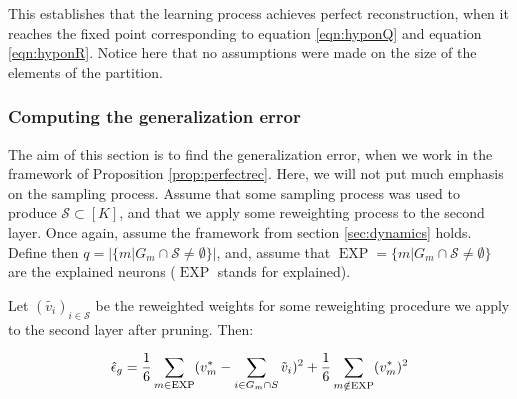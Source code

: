 This establishes that the learning process achieves perfect reconstruction, when it reaches the fixed point corresponding to equation \ref{eqn:hyponQ} and equation \ref{eqn:hyponR}. Notice here that no assumptions were made on the size of the elements of the partition.


\subsubsection{Computing the generalization error}

The aim of this section is to find the generalization error, when we work in the framework of Proposition \ref{prop:perfectrec}. Here, we will not put much emphasis on the sampling process. Assume that some sampling process was used to produce $\mathcal{S} \subset [K]$, and that we apply some reweighting process to the second layer. Once again, assume the framework from section \ref{sec:dynamics} holds. Define then $q = \lvert \{ m | G_m \cap \mathcal{S} \neq \emptyset \} \rvert$, and, assume that $ \operatorname{EXP} = \{ m | G_m \cap \mathcal{S} \neq \emptyset \}$  are the explained neurons ($\operatorname{EXP}$ stands for explained).

\begin{theorem}\label{thm:geneerrorreweight}
    Let $(\tilde{v_i})_{i\in \mathcal{S}}$ be the reweighted weights for some reweighting procedure we apply to the second layer after pruning. Then:

    $$\hat{\epsilon}_g = \dfrac{1}{6} \sum \limits_{m \in \operatorname{EXP}} (v_m^* - \sum \limits_{i \in G_m \cap S} \Tilde{v}_i)^2 + \dfrac{1}{6} \sum \limits_{m \notin \operatorname{EXP}} (v_m^*)^2 $$
\end{theorem}

